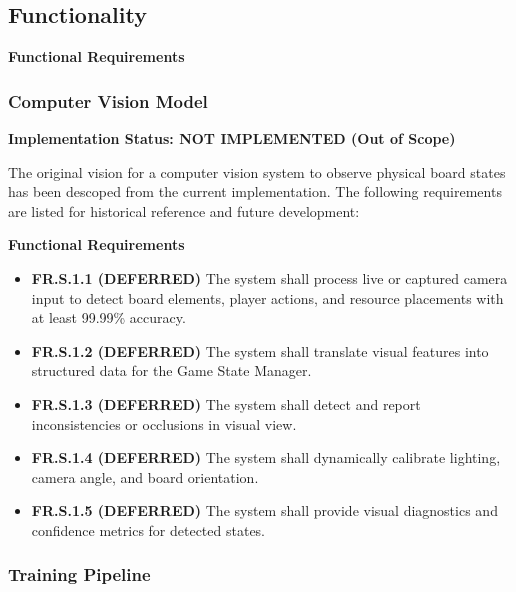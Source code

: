 \documentclass{article}
\begin{document}
\subsection{Functionality}\label{subsec:functionality}


\textbf{Functional Requirements}

\subsubsection{Computer Vision Model}

\textbf{Implementation Status: NOT IMPLEMENTED (Out of Scope)}

The original vision for a computer vision system to observe physical board states has been descoped from the current implementation. The following requirements are listed for historical reference and future development:

\textbf{Functional Requirements}

\begin{itemize}
  \item \label{FR.S.1.1}\textbf{FR.S.1.1 (DEFERRED)} The system shall process live or captured camera input to detect board elements, player actions, and resource placements with at least 99.99\% accuracy.
  \item \label{FR.S.1.2}\textbf{FR.S.1.2 (DEFERRED)} The system shall translate visual features into structured \GameState{} data for the Game State Manager.
  \item \label{FR.S.1.3}\textbf{FR.S.1.3 (DEFERRED)} The system shall detect and report inconsistencies or occlusions in visual view.
  \item \label{FR.S.1.4}\textbf{FR.S.1.4 (DEFERRED)} The system shall dynamically calibrate lighting, camera angle, and board orientation.
  \item \label{FR.S.1.5}\textbf{FR.S.1.5 (DEFERRED)} The system shall provide visual diagnostics and confidence metrics for detected states.
\end{itemize}

\subsubsection{Training Pipeline}
\end{document}
